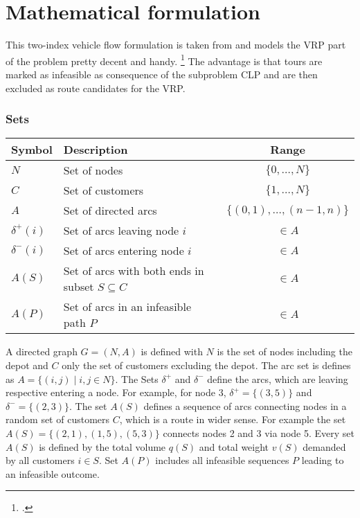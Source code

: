 \chapter{Mathematical formulation}
\label{chap:mathematical_formulation}

This two-index vehicle flow formulation is taken from \cite{tamke_branch-and-cut_2024} and
models the \gls{VRP} part of the problem pretty decent and handy. \footcite[cf.][pp. 6-7]{tamke_branch-and-cut_2024}
The advantage is that tours are marked as infeasible as consequence of
the subproblem \gls{CLP} and are then excluded as route candidates
for the \gls{VRP}.

\subsection*{Sets}
\begin{table}[ht]
    \begin{tabular}{llc}
        \toprule
        Symbol        & Description                                          & Range                         \\
        \midrule
        $N$           & Set of nodes                                         & $\{ 0, \dots, N \}$           \\
        $C$           & Set of customers                                     & $\{ 1, \dots, N \} $          \\
        $A$           & Set of directed arcs                                 & $\{(0,1), \dots, (n-1, n) \}$ \\
        $\delta^+(i)$ & Set of arcs leaving node $i$                         & $\in A$                       \\
        $\delta^-(i)$ & Set of arcs entering node $i$                        & $\in A$                       \\
        $A(S)$        & Set of arcs with both ends in subset $S \subseteq C$ & $\in A$                       \\
        $A(P)$        & Set of arcs in an infeasible path $P$                & $\in A$                       \\
        \bottomrule
    \end{tabular}
\end{table}
\vspace{0.2em}

A directed graph $G=(N,A)$ is defined  with $N$ is the set of nodes including
the depot and $C$ only the set of customers excluding the depot. The arc set is
defines as $A = \{ (i, j) \mid i, j \in N \}$. The Sets $\delta^+$ and $\delta^-$ define
the arcs, which are leaving respective entering a node. For example, for node 3, $\delta^+ = \{(3,5)\}$ and $\delta^-= \{(2,3)\}$.
The set $A(S)$ defines a sequence of arcs connecting nodes in a random set of customers $C$,
which is a route in wider sense. For example the set $A(S)=\{(2,1),(1,5),(5,3)\}$ connects nodes
2 and 3 via node 5. Every set $A(S)$ is defined by the total volume $q(S)$ and total weight $v(S)$
demanded by all customers $i \in S$. Set $A(P)$ includes all infeasible sequences $P$ leading
to an infeasible outcome.


